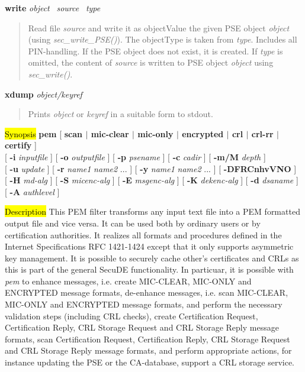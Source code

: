 {\bf write} {\em object}~ {\em source}~ {\em type}
\begin{quote}
Read file {\em source} and write it as objectValue the given PSE object {\em object} (using
{\em sec\_write\_PSE()}). The objectType is taken from {\em type}.
Includes all PIN-handling. If the PSE object does not exist, it is created.
If {\em type} is omitted, the content of {\em source} is written to PSE object
{\em object} using {\em sec\_write()}.
\end{quote}

{\bf xdump} {\em object/keyref} 
\begin{quote}
Prints {\em object} or {\em keyref} in a suitable form to stdout.
\end{quote}

\label{pem}
\hl{Synopsis}
{\bf pem} [ {\bf scan $|$ mic-clear $|$ mic-only $|$ encrypted $|$ crl $|$ crl-rr $|$ certify } ]
\\ \hspace*{0.95cm} 
[ {\bf -i} {\em inputfile} ] [ {\bf -o} {\em outputfile} ] [ {\bf -p} {\em psename} ] [ {\bf -c} {\em cadir} ] [ {\bf 
-m/M}  {\em depth} ] 
\\ \hspace*{0.95cm}
[ {\bf -u} {\em update} ] [ {\bf -r} {\em name1} {\em name2} ... ] [ {\bf -y} {\em name1} {\em name2} ... ] [ {\bf 
-DFRCnhvVNO} ]
\\ \hspace*{0.95cm}
[ {\bf -H} {\em md-alg} ] [ {\bf -S} {\em micenc-alg} ] [ {\bf -E} {\em msgenc-alg} ] [ 
{\bf -K} {\em dekenc-alg} ] [ {\bf -d} {\em dsaname} ]
\\ \hspace*{0.95cm} [ {\bf -A} {\em authlevel} ]

\hl{Description}
This PEM filter transforms any input text file into a PEM formatted output file 
and vice versa. It can be used both by ordinary users or by certification
authorities. It realizes all formats 
and procedures defined in the Internet Specifications RFC 1421-1424 
except that it only supports asymmetric key management. It is
possible to securely cache other's certificates and CRLs as this 
is part of the general SecuDE functionality. In particuar, it is possible
with {\em pem} to
\bi
   \m enhance messages, i.e. create MIC-CLEAR, MIC-ONLY and
      ENCRYPTED message formats,
   \m de-enhance messages, i.e. scan MIC-CLEAR, MIC-ONLY and
      ENCRYPTED message formats, and perform the necessary
      validation steps (including CRL checks),
   \m create Certification Request, Certification Reply, CRL Storage
      Request and CRL Storage Reply message formats,
   \m scan Certification Request, Certification Reply, CRL Storage
      Request and CRL Storage Reply message formats, and perform
      appropriate actions, for instance updating the PSE or
      the CA-database,
   \m support a CRL storage service.
\ei

